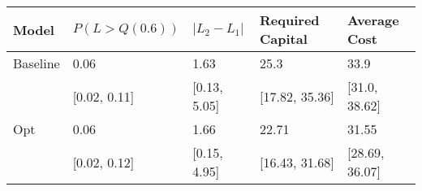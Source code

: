 \begin{tabular}{lllll}
\toprule
   Model & $P(L > Q(0.6))$ & $|L_2 - L_1|$ & Required Capital &   Average Cost \\
\midrule
Baseline &            0.06 &          1.63 &             25.3 &           33.9 \\
         &    [0.02, 0.11] &  [0.13, 5.05] &   [17.82, 35.36] &  [31.0, 38.62] \\
     Opt &            0.06 &          1.66 &            22.71 &          31.55 \\
         &    [0.02, 0.12] &  [0.15, 4.95] &   [16.43, 31.68] & [28.69, 36.07] \\
\bottomrule
\end{tabular}
